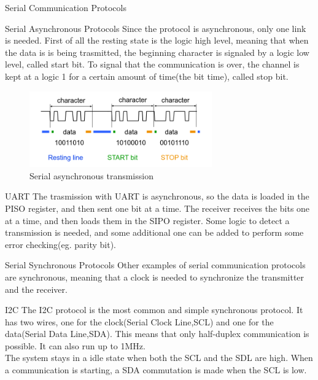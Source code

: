 \begin{section}{Serial Communication Protocols}
  \begin{subsection}{Serial Asynchronous Protocols}
    Since the protocol is asynchronous, only one link is needed. First of all the resting state is
    the logic high level, meaning that when the data is is being trasmitted, the beginning
    character is signaled by a logic low level, called start bit. To signal that the communication
    is over, the channel is kept at a logic 1 for a certain amount of time(the bit time), called
    stop bit. 

    \begin{figure}[H]
      \centering
      \includegraphics[width=0.7\textwidth]{img/hardware/serial asybncronous transmission.png}
      \caption{Serial asynchronous transmission}
    \end{figure}
    \begin{subsubsection}{UART}
      The trasmission with UART is asynchronous, so the data is loaded in the PISO register, and
      then sent one bit at a time. The receiver receives the bits one at a time, and then loads
      them in the SIPO register. Some logic to detect a transmission is needed, and some additional
      one can be added to perform some error checking(eg. parity bit).
    \end{subsubsection}
  \end{subsection}

  \begin{subsection}{Serial Synchronous Protocols}
    Other examples of serial communication protocols are synchronous, meaning that a clock is needed
    to synchronize the transmitter and the receiver. 
    \begin{subsubsection}{I2C}
      The I2C protocol is the most common and simple synchronous protocol. It has two wires, one for 
      the clock(Serial Clock Line,SCL) and one for the data(Serial Data Line,SDA). This means that
      only half-duplex communication is possible. It can also run up to 1MHz.\\
      The system stays in a idle state when both the SCL and the SDL are high. When a communication
      is starting, a SDA commutation is made when the SCL is low.


\end{subsubsection}
\end{subsection}
\end{section}
